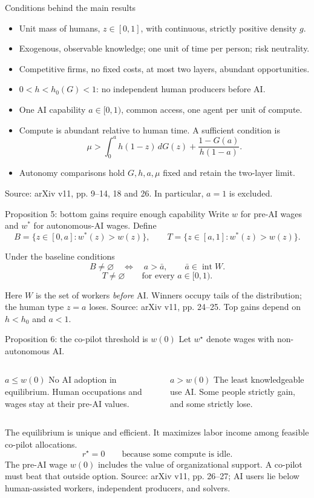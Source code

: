 \documentclass[aspectratio=169,11pt]{beamer}
\newcommand{\ai}{a}
\newcommand{\wa}{w^{*}}
\newcommand{\wc}{w^{\star}}
\newcommand{\src}[1]{\vfill{\scriptsize\color{gray}Source: arXiv v11, #1.}}
\begin{document}
\begin{frame}{Conditions behind the main results}
\small
\begin{itemize}
\item Unit mass of humans, $z\in[0,1]$, with continuous, strictly positive density $g$.
\item Exogenous, observable knowledge; one unit of time per person; risk neutrality.
\item Competitive firms, no fixed costs, at most two layers, abundant opportunities.
\item $0<h<h_0(G)<1$: no independent human producers before AI.
\item One AI capability $\ai\in[0,1)$, common access, one agent per unit of compute.
\item Compute is abundant relative to human time. A sufficient condition is
\[
\mu>\int_0^{\ai}h(1-z)\,dG(z)+\frac{1-G(\ai)}{h(1-\ai)}.
\]
\item Autonomy comparisons hold $G,h,\ai,\mu$ fixed and retain the two-layer limit.
\end{itemize}
\src{pp. 9--14, 18 and 26. In particular, $\ai=1$ is excluded}
\end{frame}

\begin{frame}{Proposition 5: bottom gains require enough capability}
Write $w$ for pre-AI wages and $\wa$ for autonomous-AI wages. Define
\[
B=\{z\in[0,\ai]:\wa(z)>w(z)\},\qquad
T=\{z\in[\ai,1]:\wa(z)>w(z)\}.
\]
\begin{block}{Under the baseline conditions}
\[
B\ne\varnothing\quad\Longleftrightarrow\quad \ai>\bar a,
\qquad \bar a\in\operatorname{int}W.
\]
\[
T\ne\varnothing\qquad\text{for every }\ai\in[0,1).
\]
\end{block}
Here $W$ is the set of workers \emph{before} AI. Winners occupy tails of the distribution; the human type $z=\ai$ loses.
\src{pp. 24--25. Top gains depend on $h<h_0$ and $\ai<1$}
\end{frame}

\begin{frame}{Proposition 6: the co-pilot threshold is $w(0)$}
Let $\wc$ denote wages with non-autonomous AI.
\begin{columns}[T]
\begin{block}{$\ai\le w(0)$}
No AI adoption in equilibrium. Human occupations and wages stay at their pre-AI values.
\end{block}
\begin{block}{$\ai>w(0)$}
The least knowledgeable use AI. Some people strictly gain, and some strictly lose.
\end{block}
\end{columns}
\medskip
The equilibrium is unique and efficient. It maximizes labor income among feasible co-pilot allocations.
\[
r^\star=0\qquad\text{because some compute is idle.}
\]
The pre-AI wage $w(0)$ includes the value of organizational support. A co-pilot must beat that outside option.
\src{pp. 26--27; AI users lie below human-assisted workers, independent producers, and solvers}
\end{frame}
\end{document}
